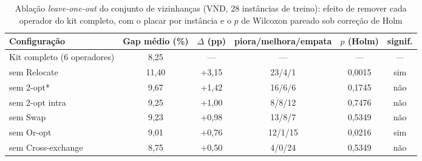 \begin{table}[H]
\centering\singlespacing
\begin{minipage}{\textwidth}
\caption{Ablação \emph{leave-one-out} do conjunto de vizinhanças (VND, 28 instâncias de treino): efeito de remover cada operador do kit completo, com o placar por instância e o $p$ de Wilcoxon pareado sob correção de Holm}
\label{tab:ablacao}
\centering
\small\setlength{\tabcolsep}{4pt}
\begin{tabular}{lccccc}
\toprule
\textbf{Configuração} & \textbf{Gap médio (\%)} & \textbf{$\Delta$ (pp)} & \textbf{piora/melhora/empata} & \textbf{$p$ (Holm)} & \textbf{signif.} \\
\midrule
Kit completo (6 operadores) & 8{,}25 & --- & --- & --- & --- \\
\quad sem Relocate & 11{,}40 & +3{,}15 & 23/4/1 & 0{,}0015 & sim \\
\quad sem 2-opt\hspace{0.5pt}* & 9{,}67 & +1{,}42 & 16/6/6 & 0{,}1745 & não \\
\quad sem 2-opt intra & 9{,}25 & +1{,}00 & 8/8/12 & 0{,}7476 & não \\
\quad sem Swap & 9{,}23 & +0{,}98 & 13/8/7 & 0{,}5349 & não \\
\quad sem Or-opt & 9{,}01 & +0{,}76 & 12/1/15 & 0{,}0216 & sim \\
\quad sem Cross-exchange & 8{,}75 & +0{,}50 & 4/0/24 & 0{,}5349 & não \\
\bottomrule
\end{tabular}
\end{minipage}
\end{table}
